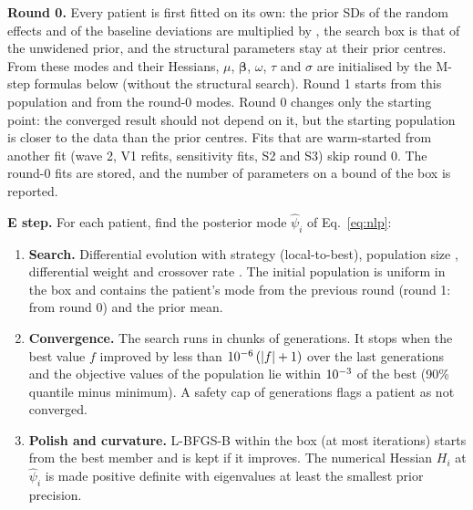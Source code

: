 \documentclass[11pt]{article}
\begin{document}
\textbf{Round 0.} Every patient is first fitted on its own: the prior SDs of the random effects and of the baseline deviations are multiplied by \valRoundZeroMult, the search box is that of the unwidened prior, and the structural parameters stay at their prior centres. From these modes and their Hessians, $\mu$, $\boldsymbol\beta$, $\omega$, $\tau$ and $\sigma$ are initialised by the M-step formulas below (without the structural search). Round 1 starts from this population and from the round-0 modes. Round 0 changes only the starting point: the converged result should not depend on it, but the starting population is closer to the data than the prior centres. Fits that are warm-started from another fit (wave 2, V1 refits, sensitivity fits, S2 and S3) skip round 0. The round-0 fits are stored, and the number of parameters on a bound of the box is reported.

\textbf{E step.} For each patient, find the posterior mode $\hat\psi_i$ of Eq.~\ref{eq:nlp}:
\begin{enumerate}
\item \textbf{Search.} Differential evolution with strategy \valDeStrategy{} (local-to-best), population size \valDeNp, differential weight \valDeF{} and crossover rate \valDeCR. The initial population is uniform in the box and contains the patient's mode from the previous round (round 1: from round 0) and the prior mean.
\item \textbf{Convergence.} The search runs in chunks of \valDeChunk{} generations. It stops when the best value $f$ improved by less than $10^{-6}\,(|f|+1)$ over the last \valDeWindow{} generations and the objective values of the population lie within $10^{-3}$ of the best (90\% quantile minus minimum). A safety cap of \valDeMaxGen{} generations flags a patient as not converged.
\item \textbf{Polish and curvature.} L-BFGS-B within the box (at most \valDePolish{} iterations) starts from the best member and is kept if it improves. The numerical Hessian $H_i$ at $\hat\psi_i$ is made positive definite with eigenvalues at least the smallest prior precision.
\end{enumerate}
\end{document}
